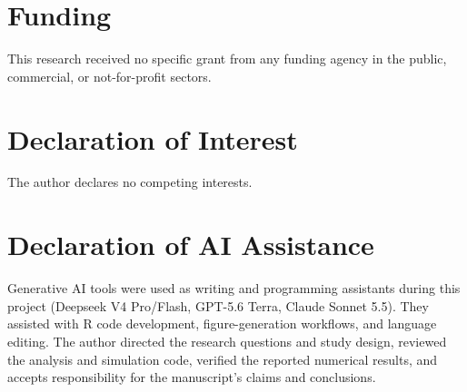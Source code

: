 \documentclass[11pt]{article}
\begin{document}
\section*{Funding}
This research received no specific grant from any funding agency in the public, commercial, or not-for-profit sectors.

\section*{Declaration of Interest}
The author declares no competing interests.

\section*{Declaration of AI Assistance}
Generative AI tools were used as writing and programming assistants during this project (Deepseek V4 Pro/Flash, GPT-5.6 Terra, Claude Sonnet 5.5). They assisted with R code development, figure-generation workflows, and language editing. The author directed the research questions and study design, reviewed the analysis and simulation code, verified the reported numerical results, and accepts responsibility for the manuscript's claims and conclusions.



\end{document}
